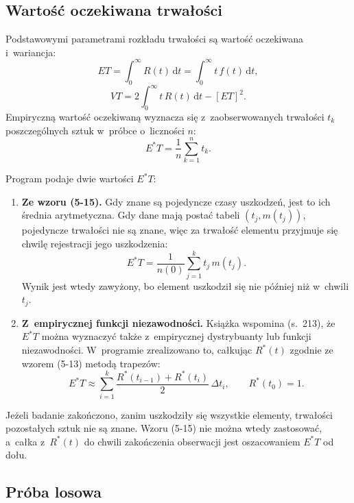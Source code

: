 \subsection{Wartość oczekiwana trwałości}

Podstawowymi parametrami rozkładu trwałości są wartość oczekiwana i~wariancja:
\begin{equation}
  ET = \int_0^\infty R(t)\,\mathrm{d}t = \int_0^\infty t\,f(t)\,\mathrm{d}t, \tag{5-13}
\end{equation}
\begin{equation}
  VT = 2\int_0^\infty t\,R(t)\,\mathrm{d}t - [ET]^2. \tag{5-14}
\end{equation}
Empiryczną wartość oczekiwaną wyznacza się z~zaobserwowanych trwałości $t_k$
poszczególnych sztuk w~próbce o~liczności $n$:
\begin{equation}
  E^*T = \frac{1}{n} \sum_{k=1}^{n} t_k. \tag{5-15}
\end{equation}

Program podaje dwie wartości $E^*T$:
\begin{enumerate}
  \item \textbf{Ze wzoru (5-15).} Gdy znane są pojedyncze czasy uszkodzeń, jest to
    ich średnia arytmetyczna. Gdy dane mają postać tabeli $(t_j, m(t_j))$,
    pojedyncze trwałości nie są znane, więc za trwałość elementu przyjmuje się
    chwilę rejestracji jego uszkodzenia:
    \begin{equation*}
      E^*T = \frac{1}{n(0)} \sum_{j=1}^{k} t_j\, m(t_j).
    \end{equation*}
    Wynik jest wtedy zawyżony, bo element uszkodził się nie później niż w~chwili
    $t_j$.
  \item \textbf{Z~empirycznej funkcji niezawodności.} Książka wspomina (s.~213), że
    $E^*T$ można wyznaczyć także z~empirycznej dystrybuanty lub funkcji
    niezawodności. W~programie zrealizowano to, całkując $R^*(t)$ zgodnie ze
    wzorem (5-13) metodą trapezów:
    \begin{equation*}
      E^*T \approx \sum_{i=1}^{k} \frac{R^*(t_{i-1}) + R^*(t_i)}{2}\,\Delta t_i,
      \qquad R^*(t_0) = 1.
    \end{equation*}
\end{enumerate}
Jeżeli badanie zakończono, zanim uszkodziły się wszystkie elementy, trwałości
pozostałych sztuk nie są znane. Wzoru (5-15) nie można wtedy zastosować, a~całka
z~$R^*(t)$ do chwili zakończenia obserwacji jest oszacowaniem $E^*T$ od dołu.

\subsection{Próba losowa}
\label{sec:distributions}

